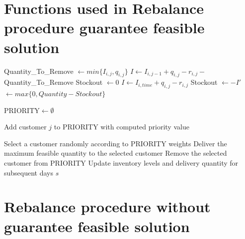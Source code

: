 \documentclass{article}
\begin{document}
\section{Functions used in Rebalance procedure guarantee feasible solution}



\begin{algorithm}[H]
\caption{\textbf{Feasible\_Quantity\_To\_Removal$(i,j)$}} \label{alg:FeasibleQuantityRemoval}
\begin{algorithmic}[1]
\STATE Quantity\_To\_Remove $\gets min\{I_{i,j}, q_{i,j}\}$ 
\STATE $I\gets I_{i,j-1}+ q_{i,j} -r_{i,j} - $Quantity\_To\_Remove 
\STATE Stockout $\gets 0$
\STATE $I\gets I_{i,time}+ q_{i,j} -r_{i,j}$
    \STATE Stockout $\gets -I'$
\ENDIF
\ENDFOR
\RETURN $\gets max\{0, Quantity - Stockout\}$
\end{algorithmic}
\end{algorithm}



\begin{algorithm}[H]
\caption{\textbf{Assign\_max\_possible\_quantity\_after\_feasible$(s)$}} \label{alg:AssignQuantity}
\begin{algorithmic}[1]

\STATE $\text{PRIORITY} \gets \emptyset$
    
            \STATE Add customer $j$ to PRIORITY with computed priority value
        \ENDIF
    \ENDFOR
    
        \STATE Select a customer randomly according to PRIORITY weights
        \STATE Deliver the maximum feasible quantity to the selected customer
        \STATE Remove the selected customer from PRIORITY
        \STATE Update inventory levels and delivery quantity for subsequent days
    \ENDWHILE
\ENDFOR
\RETURN $s$
\end{algorithmic}
\end{algorithm}


\section{Rebalance procedure without guarantee feasible solution}\label{sec: rebalance without feasibility}
\end{document}
